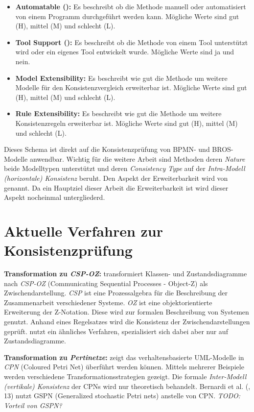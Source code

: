 \begin{itemize}
    \item \textbf{Automatable (\cite{Usman2008}):} Es beschreibt ob die Methode manuell oder automatisiert von einem Programm durchgeführt werden kann. Mögliche Werte sind gut (H), mittel (M) und schlecht (L).
    \item \textbf{Tool Support (\cite{Usman2008}):} Es beschreibt ob die Methode von einem Tool unterstützt wird oder ein eigenes Tool entwickelt wurde. Mögliche Werte sind ja und nein.
    \item \textbf{Model Extensibility:} Es beschreibt wie gut die Methode um weitere Modelle für den Konsistenzvergleich erweiterbar ist. Mögliche Werte sind gut (H), mittel (M) und schlecht (L).
    \item \textbf{Rule Extensibility:} Es beschreibt wie gut die Methode um weitere Konsistenzregeln erweiterbar ist. Mögliche Werte sind gut (H), mittel (M) und schlecht (L).
\end{itemize}

Dieses Schema ist direkt auf die Konsistenzprüfung von BPMN- und BROS-Modelle anwendbar.
Wichtig für die weitere Arbeit sind Methoden deren \emph{Nature} beide Modelltypen unterstützt und deren \emph{Consistency Type} auf der \emph{Intra-Modell (horizontale) Konsistenz} beruht.
Den Aspekt der Erweiterbarkeit wird von \cite{Lucas2009} genannt.
Da ein Hauptziel dieser Arbeit die Erweiterbarkeit ist wird dieser Aspekt nocheinmal untergliederd.

\section{Aktuelle Verfahren zur Konsistenzprüfung}

\textbf{Transformation zu \emph{CSP-OZ}:}
\cite{Rasch2003} transformiert Klassen- und Zustandsdiagramme nach \emph{CSP-OZ} (Communicating Sequential Processes - Object-Z) als Zwischendarstellung.
\emph{CSP} ist eine Prozessalgebra für die Beschreibung der Zusammenarbeit verschiedener Systeme. 
\emph{OZ} ist eine objektorientierte Erweiterung der Z-Notation. Diese wird zur formalen Beschreibung von Systemen genutzt.
Anhand eines Regelsatzes wird die Konsistenz der Zwischendarstellungen geprüft.
\cite{Kim2004} nutzt ein ähnliches Verfahren, spezialisiert sich dabei aber nur auf Zustandsdiagramme.

\textbf{Transformation zu \emph{Pertinetze}:}
\cite{Shinkawa2006} zeigt das verhaltensbasierte UML-Modelle in \emph{CPN} (Coloured Petri Net) überführt werden können.
Mittels mehrerer Beispiele werden verschiedene Transformationsstrategien gezeigt.
Die formale \emph{Inter-Modell (vertikale) Konsistenz} der CPNs wird nur theoretisch behandelt.
Bernardi et al. (\cite{Usman2008}, 13) nutzt GSPN (Generalized stochastic Petri nets) anstelle von CPN. \textit{TODO: Vorteil von GSPN?}

